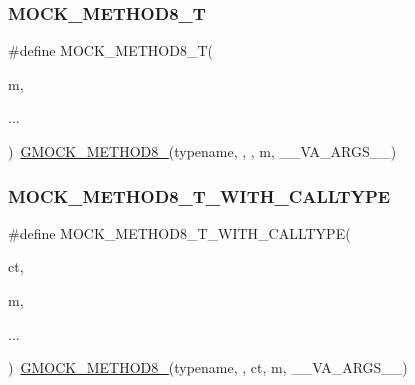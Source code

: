 \mbox{\label{_obj__test_2lib_2googletest-master_2googlemock_2include_2gmock_2gmock-generated-function-mockers_8h_aa7e6573bb6a57f2a2d3c2875caeffaa3}} 
\subsubsection{\texorpdfstring{MOCK\_METHOD8\_T}{MOCK\_METHOD8\_T}}
{\footnotesize\ttfamily \#define M\+O\+C\+K\+\_\+\+M\+E\+T\+H\+O\+D8\+\_\+T(\begin{DoxyParamCaption}\item[{}]{m,  }\item[{}]{... }\end{DoxyParamCaption})~\mbox{\hyperlink{_obj__test_2lib_2googletest-release-1_88_81_2googlemock_2include_2gmock_2gmock-generated-function-mockers_8h_aa84a36427c44505207b7cad5dec7ad67}{G\+M\+O\+C\+K\+\_\+\+M\+E\+T\+H\+O\+D8\+\_\+}}(typename, , , m, \+\_\+\+\_\+\+V\+A\+\_\+\+A\+R\+G\+S\+\_\+\+\_\+)}

\mbox{\label{_obj__test_2lib_2googletest-master_2googlemock_2include_2gmock_2gmock-generated-function-mockers_8h_a0cf1d3aba371dfe424d27b97b5473174}} 
\subsubsection{\texorpdfstring{MOCK\_METHOD8\_T\_WITH\_CALLTYPE}{MOCK\_METHOD8\_T\_WITH\_CALLTYPE}}
{\footnotesize\ttfamily \#define M\+O\+C\+K\+\_\+\+M\+E\+T\+H\+O\+D8\+\_\+\+T\+\_\+\+W\+I\+T\+H\+\_\+\+C\+A\+L\+L\+T\+Y\+PE(\begin{DoxyParamCaption}\item[{}]{ct,  }\item[{}]{m,  }\item[{}]{... }\end{DoxyParamCaption})~\mbox{\hyperlink{_obj__test_2lib_2googletest-release-1_88_81_2googlemock_2include_2gmock_2gmock-generated-function-mockers_8h_aa84a36427c44505207b7cad5dec7ad67}{G\+M\+O\+C\+K\+\_\+\+M\+E\+T\+H\+O\+D8\+\_\+}}(typename, , ct, m, \+\_\+\+\_\+\+V\+A\+\_\+\+A\+R\+G\+S\+\_\+\+\_\+)}

